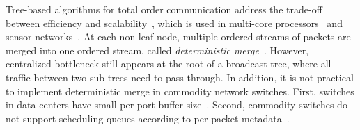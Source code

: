 



Tree-based algorithms for total order communication address the trade-off between efficiency and scalability~\cite{rodrigues1998scalable}, which is used in multi-core processors~\cite{kaestle2016machine} and sensor networks~\cite{chakraborty2011reliable}.
At each non-leaf node, multiple ordered streams of packets are merged into one ordered stream, called \textit{deterministic merge}~\cite{hadzilacos1994modular, aguilera2000efficient}.
However, centralized bottleneck still appears at the root of a broadcast tree, where all traffic between two sub-trees need to pass through.
In addition, it is not practical to implement deterministic merge in commodity network switches.
First, switches in data centers have small per-port buffer size~\cite{bai2017congestion}.
Second, commodity switches do not support scheduling queues according to per-packet metadata~\cite{sivaraman2016programmable,jin2018netchain}.





